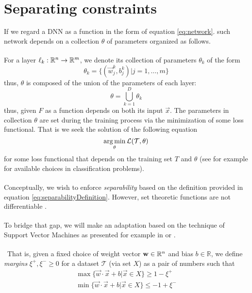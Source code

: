 
\section{Separating constraints}\label{sec:constraint}
If we regard a DNN as a function in the form of equation \ref{eq:network}. such network depends on a collection $\theta$ of parameters organized as follows. 
\\\\
For a layer $\ell_k:\mathbb{R}^{n}\rightarrow\mathbb{R}^{m}$, we denote its collection of parameters $\theta_k$ of the form
\begin{equation}
    \theta_k = \{(\vec{w}^k_j,b^k_j)|j=1,\ldots,m\}
\end{equation}
thus, $\theta$ is composed of the union of the parameters of each layer:
\begin{equation}
    \theta = \displaystyle\bigcup_{k=1}^D\theta_k
\end{equation}
thus, given $F$ as a function depends on both its input $\vec{x}$. The parameters in collection $\theta$ are set during the training process via the minimization of some loss functional. That is we seek the solution of the following equation
\begin{equation}\label{eq:generalOptimizationProblem}
\operatorname*{arg\,min}_{\theta} \mathcal{L}(\mathcal{T},\theta)
\end{equation}
for some loss functional that depends on the training set $T$ and $\theta$ (see for example \cite{LeCun06atutorial} for available choices in classification problems). 
\\\\
Conceptually, we wish to enforce \ReLU \emph{separability} based on the definition provided in equation \ref{eq:separabilityDefinition}. However, set theoretic functions are not differentiable \cite{Glorot10Initialization,lecun2015DeepLearningBig,munkres2000Topology}. 
\\\\
To bridge that gap, we will make an adaptation based on the technique of Support Vector Machines as presented for example in  \cite{Burges1998TutorialOnSVMForPatternRecognition} or \cite{Hearst1998SupportVectorMachines}. 
\\\\\
That is, given a fixed choice of weight vector  $\mathbf{w}\in\mathbb{R}^{n}$ and bias $b\in\mathbb{R}$, we define \emph{margins} $\xi^{+},\xi^{-}\geq 0$ for a dataset $\mathcal{T}$ (via set $X$) as a pair of numbers such that
\begin{equation}\label{eq:basicConstraintFormulation}
\begin{array}{lcl}
    \max\{\vec{w}\cdot\vec{x}+b|\vec{x}\in X\}\geq 1-\xi^{+}\\
    \min\{\vec{w}\cdot\vec{x}+b|\vec{x}\in X\}\leq -1+\xi^{-}\\
\end{array}
\end{equation}
